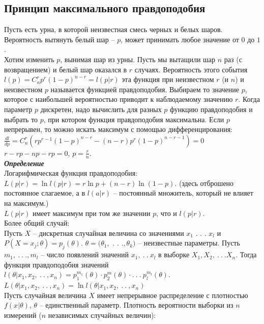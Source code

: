\documentclass[russian, 12pt, fleqn,x11names]{article}
\begin{document}
\subsection{Принцип максимального правдоподобия}
\noindent
Пусть есть урна, в которой неизвестная смесь черных и белых шаров.\\ Вероятность вытянуть белый шар -- $p$, может принимать любое значение от $0$ до $1$ .\\ 
Хотим изменить $p$, вынимая шар из урны. Пусть мы вытащили шар $n$ раз (с возвращением) и белый шар оказался в $r$ случаях. Вероятность этого события $l(p) = C^r_n p^r (1-p)^{n - r} = l(p|r)$ эта функция при неизвестном $r$ (и $n$) и неизвестном $p$ называется функцией правдоподобия. Выбираем то значение $p$, которое с наибольшей  вероятностью приводит к наблюдаемому значению $r$. Когда параметр $p$ дискретен, надо вычислить для разных $p$ функцию правдоподобия  и выбрать то $p$, при котором функция правдоподобия максимальна.  Если $p$ непрерывен, то можно искать максимум с помощью дифференцирования: $\frac{dl}{dp} = C^r_n (rp^{r - 1}(1-p)^{n - r} - (n - r) p ^ r  (1-p) ^{n - r - 1}) = 0$\\
$r - rp - np - rp = 0$, $p = \frac{r}{n}$.\\
\textit{\textbf{Определение}}\\
Логарифмическая функция правдоподобия: \\$L(p|r) = \ln l(p|r) = r \ln p + (n-r) \ln (1-p)$. (здесь отброшено постоянное слагаемое, а в $l(a|r)$ -- постоянный множитель, который не влияет на максимум.)\\
$L(p|r)$ имеет максимум при том же значении $p$, что и $l(p|r)$.\\
Более общий случай:\\
Пусть $X$ -- дискретная случайная величина со значениями $x_1$ . . . $x_l$ и\\ $P(X=x_j; \theta) = p_j(\theta)$. $\theta = (\theta_1, $ . . .$,\theta_k)$ -- неизвестные параметры. Пусть $m_1, \ .\ .\ .,m_l$ -- число появлений значений $x_1, \ .\ .\ x_l$ в выборке $X_1, X_2, \ .\ .\ . X_n$. Тогда функция правдоподобия  значений $l(\theta | x_1, x_2, \ .\ .\ , x_n) = p_1^{m_1}(\theta) \cdot p_2^m(\theta) \cdot . \ .\ .\ p_l^{m_l}(\theta)$. $ L(\theta | x_1, x_2, \ .\ .\ , x_n) =\ln l (\theta | x_1, x_2, \ .\ .\ , x_n) $\\
Пусть случайная величина $X$ имеет непрерывное распределение с плотностью $f(x|\theta)$, $\theta$ -- единственный параметр. Плотность вероятности выборки из $n$ измерений ($n$ независимых случайных величин):\\
\end{document}
